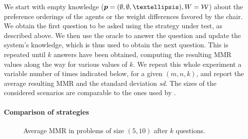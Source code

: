\documentclass{article}
\begin{document}
We start with empty knowledge ($\pprofile = (\emptyset, \emptyset, …), W = \W$) about the preference orderings of the agents or the weight differences favored by the chair. We obtain the first question to be asked using the strategy under test, as described above. We then use the oracle to answer the question and update the system's knowledge, which is thus used to obtain the next question. This is repeated until $k$ answers have been obtained, computing the resulting MMR values along the way for various values of $k$. We repeat this whole experiment a variable number of times indicated below, for a given $(m, n, k)$, and report the average resulting MMR and the standard deviation \textit{sd}. The sizes of the considered scenarios are comparable to the ones used by \citet{Cailloux2014}. 

\paragraph{Comparison of strategies}
\begin{figure}
	\caption{Average MMR in problems of size $(5, 10)$ after $k$ questions.}
	\label{fig:smallSize}
\end{figure}
\end{document}
